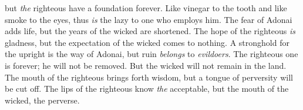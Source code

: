 \begin{biblechapter}
but \textit{the} righteous have a foundation forever.
\verse Like vinegar to the tooth and like smoke to the eyes, 
thus \textit{is} the lazy to one who employs him.
\verse The fear of Adonai adds life, 
but the years of the wicked are shortened.
\verse The hope of the righteous \textit{is} gladness, 
but the expectation of the wicked comes to nothing.
\verse A stronghold for the upright is the way of Adonai, 
but ruin \textit{belongs} to \textit{evildoers}.
\verse The righteous one is forever; he will not be removed. 
But the wicked will not remain in the land.
\verse The mouth of the righteous brings forth wisdom, 
but a tongue of perversity will be cut off.
\verse The lips of the righteous know \textit{the} acceptable, 
but the mouth of the wicked, the perverse.
\end{biblechapter}

